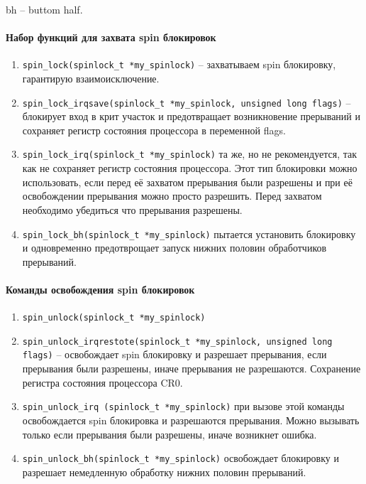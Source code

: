 bh – buttom half.

\paragraph{Набор функций для захвата spin блокировок}
\begin{enumerate}
	\item \verb|spin_lock(spinlock_t *my_spinlock)| – захватываем spin блокировку, гарантирую взаимоисключение.
	\item \verb|spin_lock_irqsave(spinlock_t *my_spinlock, unsigned long flags)| – блокирует вход в крит участок и предотвращает возникновение прерываний и сохраняет регистр состояния процессора в переменной flags. 
	\item \verb|spin_lock_irq(spinlock_t *my_spinlock)| та же, но не рекомендуется, так как не сохраняет регистр состояния процессора. Этот тип блокировки можно использовать, если перед её захватом прерывания были разрешены и при её освобождении прерывания можно просто разрешить. Перед захватом необходимо убедиться что прерывания разрешены. 
	\item \verb|spin_lock_bh(spinlock_t *my_spinlock)| пытается установить блокировку и одновременно предотврощает запуск нижних половин обработчиков прерываний. 
\end{enumerate}

\paragraph{Команды освобождения spin блокировок}
\begin{enumerate}
	\item \verb|spin_unlock(spinlock_t *my_spinlock)|
	\item \verb|spin_unlock_irqrestote(spinlock_t *my_spinlock, unsigned long flags)| – освобождает spin блокировку и разрешает прерывания, если прерывания были разрешены, иначе прерывания не разрешаются. Сохранение регистра состояния процессора CR0. 
	\item \verb|spin_unlock_irq (spinlock_t *my_spinlock)| при вызове этой команды освобождается spin блокировка и разрешаются прерывания. Можно вызывать только если прерывания были разрешены, иначе возникнет ошибка.
	\item \verb|spin_unlock_bh(spinlock_t *my_spinlock)| освобождает блокировку и разрешает немедленную обработку нижних половин прерываний.
\end{enumerate} 

 

